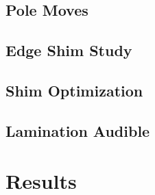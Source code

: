 
\subsection{Pole Moves}

\subsection{Edge Shim Study}

\subsection{Shim Optimization}

\subsection{Lamination Audible}

\section{Results}
